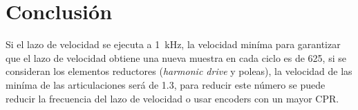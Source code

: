\chapter{Conclusión}

Si el lazo de velocidad se ejecuta a \SI{1}{\kilo\hertz}, la velocidad miníma para garantizar que el lazo de velocidad obtiene una nueva muestra en cada ciclo es de \SI{625}{\rpm}, si se consideran los elementos reductores (\textit{harmonic drive} y poleas), la velocidad de las miníma de las articulaciones será de \SI{1.3}{\rpm}, para reducir este número se puede reducir la frecuencia del lazo de velocidad o usar encoders con un mayor CPR.
